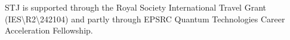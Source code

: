 \documentclass[pdflatex,sn-mathphys-num]{sn-jnl}%
\theoremstyle{thmstyleone}%
\theoremstyle{thmstyletwo}%
\theoremstyle{thmstylethree}%
\begin{document}

\backmatter






STJ is supported through the Royal Society International Travel Grant (IES\textbackslash R2\textbackslash 242104) and partly through EPSRC Quantum Technologies Career Acceleration Fellowship.



\end{document}
